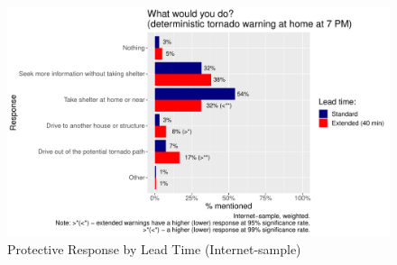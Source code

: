 \documentclass{ametsocV6.1}
\begin{document}







%



\clearpage
\newpage
\appendix[A] 

\label{torn_prone}
\label{sample_tab}

\clearpage
\newpage
\appendix[B] 

\begin{figure}[!htbp] 
\centering
\includegraphics[width=33pc]{../Graphs/contr_plot_allQ.pdf}
\caption{Protective Response by Lead Time (Internet-sample)}\label{contr_plot}
\end{figure}
\end{document}
